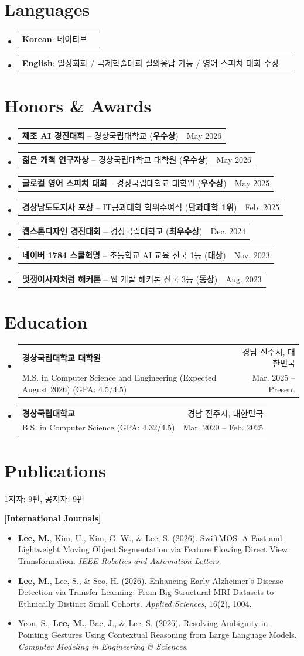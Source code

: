 \documentclass[letterpaper,11pt]{article}
\makeatletter
\newcommand{\resumeItem}[1]{
  \item\small{
    {#1 \vspace{0pt}}
  }
}
\newcommand{\resumeSubheading}[4]{
  \vspace{-1pt}\item
    \begin{tabular*}{0.97\textwidth}[t]{l@{\extracolsep{\fill}}r}
      \textbf{#1} & {\small #2} \\
      {\small #3} & {\small #4} \\
    \end{tabular*}\vspace{-5pt}
}
\newcommand{\resumeSkills}[1]{
  \item\small{
    \begin{tabular*}{0.97\textwidth}[t]{l@{\extracolsep{\fill}}r}
      #1
    \end{tabular*}\vspace{-2pt}
  }
}
\newcommand{\resumeSubHeadingListStart}{\begin{itemize}[leftmargin=*]}
\newcommand{\resumeSubHeadingListEnd}{\end{itemize}}
\makeatother
\begin{document}
\section{Languages}
\resumeSubHeadingListStart
\resumeSkills{\textbf{Korean}: 네이티브}
\resumeSkills{\textbf{English}: 일상회화 / 국제학술대회 질의응답 가능 / 영어 스피치 대회 수상}
\resumeSubHeadingListEnd

\section{Honors \& Awards}
\resumeSubHeadingListStart
\resumeSkills{\textbf{제조 AI 경진대회} -- 경상국립대학교 (\textbf{우수상}) & May 2026}
\resumeSkills{\textbf{젊은 개척 연구자상} -- 경상국립대학교 대학원 (\textbf{우수상}) & May 2026}
\resumeSkills{\textbf{글로컬 영어 스피치 대회} -- 경상국립대학교 대학원 (\textbf{우수상}) & May 2025}
\resumeSkills{\textbf{경상남도도지사 포상} -- IT공과대학 학위수여식 (\textbf{단과대학 1위}) & Feb. 2025}
\resumeSkills{\textbf{캡스톤디자인 경진대회} -- 경상국립대학교 (\textbf{최우수상}) & Dec. 2024}
\resumeSkills{\textbf{네이버 1784 스쿨혁명} -- 초등학교 AI 교육 전국 1등 (\textbf{대상}) & Nov. 2023}
\resumeSkills{\textbf{멋쟁이사자처럼 해커톤} -- 웹 개발 해커톤 전국 3등 (\textbf{동상}) & Aug. 2023}
\resumeSubHeadingListEnd

\section{Education}
\resumeSubHeadingListStart
\resumeSubheading
{경상국립대학교 대학원}{경남 진주시, 대한민국}
{M.S. in Computer Science and Engineering (Expected August 2026) (GPA: 4.5/4.5)}{Mar. 2025 -- Present}
\resumeSubheading
{경상국립대학교}{경남 진주시, 대한민국}
{B.S. in Computer Science (GPA: 4.32/4.5)}{Mar. 2020 -- Feb. 2025}
\resumeSubHeadingListEnd

\section{Publications}
\small 1저자: 9편, 공저자: 9편

\vspace{4pt}
\textbf{[International Journals]}
\resumeSubHeadingListStart
\resumeItem{\textbf{Lee, M.}, Kim, U., Kim, G. W., \& Lee, S. (2026). SwiftMOS: A Fast and Lightweight Moving Object Segmentation via Feature Flowing Direct View Transformation. \textit{IEEE Robotics and Automation Letters}.}
\resumeItem{\textbf{Lee, M.}, Lee, S., \& Seo, H. (2026). Enhancing Early Alzheimer's Disease Detection via Transfer Learning: From Big Structural MRI Datasets to Ethnically Distinct Small Cohorts. \textit{Applied Sciences}, 16(2), 1004.}
\resumeItem{Yeon, S., \textbf{Lee, M.}, Bae, J., \& Lee, S. (2026). Resolving Ambiguity in Pointing Gestures Using Contextual Reasoning from Large Language Models. \textit{Computer Modeling in Engineering \& Sciences}.}
\resumeSubHeadingListEnd
\end{document}
